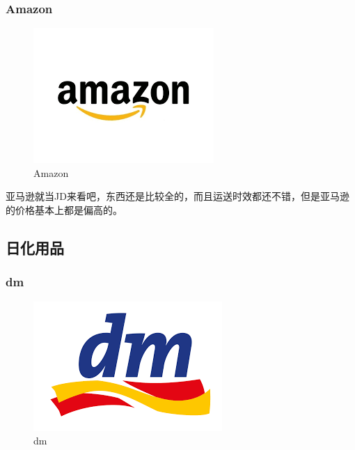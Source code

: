 \documentclass[doku]{subfiles}
\begin{document}
	\subsubsection{Amazon}
	\begin{figure}[h]
		\centering
		\includegraphics[width=0.56\linewidth]{amazon}
		\caption{Amazon}
		\label{fig:amazon}
	\end{figure}
	亚马逊就当JD来看吧，东西还是比较全的，而且运送时效都还不错，但是亚马逊的价格基本上都是偏高的。
	
	\subsection{日化用品}
	\subsubsection{dm}
	\begin{figure}[h]
		\centering
		\includegraphics[width=0.4\linewidth]{dm}
		\caption{dm}
		\label{fig:dm}
	\end{figure}
	
\end{document}
